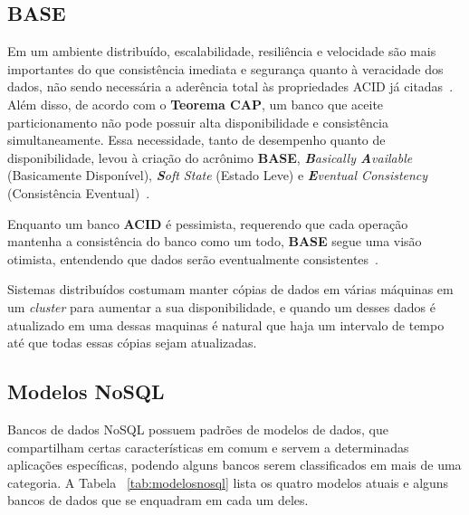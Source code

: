 
\subsection{BASE}
    Em um ambiente distribuído, escalabilidade, resiliência e velocidade são mais importantes do que consistência imediata e segurança quanto à veracidade dos  dados, não sendo necessária a aderência total às propriedades ACID já citadas~\cite{neo4j_acidbase}. Além disso, de acordo com o \textbf{Teorema CAP}, um banco que aceite particionamento não pode possuir alta disponibilidade e consistência simultaneamente. Essa necessidade, tanto de desempenho quanto de disponibilidade, levou à criação do acrônimo \textbf{BASE}, \emph{\textbf{B}asically \textbf{A}vailable} (Basicamente Disponível), \emph{\textbf{S}oft State} (Estado Leve) e \emph{\textbf{E}ventual Consistency} (Consistência Eventual)~\cite{foxcluster}. 
    
    Enquanto um banco \textbf{ACID} é pessimista, requerendo que cada operação mantenha a consistência do banco como um todo, \textbf{BASE} segue uma visão otimista, entendendo que dados serão eventualmente consistentes~\cite{pritchett2008}.
    
    Sistemas distribuídos costumam manter cópias de dados em várias máquinas em um \emph{cluster} para aumentar a sua disponibilidade, e quando um desses dados é atualizado em uma dessas maquinas é natural que haja um intervalo de tempo até que todas essas cópias sejam atualizadas.

\subsection{Modelos NoSQL}
Bancos de dados NoSQL possuem padrões de modelos de dados, que compartilham certas características em comum e servem a determinadas aplicações específicas, podendo alguns bancos serem classificados em mais de uma categoria. A Tabela ~\ref{tab:modelosnosql} lista os quatro modelos atuais e alguns bancos de dados que se enquadram em cada um deles.

